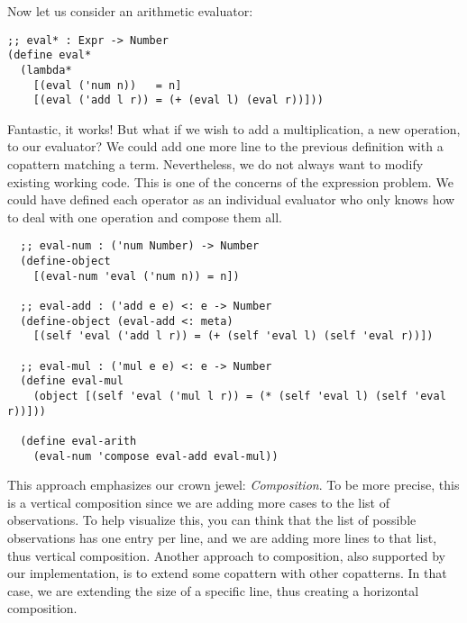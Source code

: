 Now let us consider an arithmetic evaluator:

\begin{verbatim}
;; eval* : Expr -> Number
(define eval*
  (lambda*
    [(eval ('num n))   = n]
    [(eval ('add l r)) = (+ (eval l) (eval r))]))
\end{verbatim}

Fantastic, it works! But what if we wish to add a multiplication, a new operation, to our evaluator? 
We could add one more line to the previous definition with a copattern matching a  term.
Nevertheless, we do not always want to modify existing working code.
This is one of the concerns of the expression problem.
We could have defined each operator as an individual evaluator who only knows how to deal with one operation and compose them all.

\begin{verbatim}
  ;; eval-num : ('num Number) -> Number
  (define-object
    [(eval-num 'eval ('num n)) = n])
  
  ;; eval-add : ('add e e) <: e -> Number
  (define-object (eval-add <: meta)
    [(self 'eval ('add l r)) = (+ (self 'eval l) (self 'eval r))])
  
  ;; eval-mul : ('mul e e) <: e -> Number
  (define eval-mul
    (object [(self 'eval ('mul l r)) = (* (self 'eval l) (self 'eval r))]))
  
  (define eval-arith
    (eval-num 'compose eval-add eval-mul))

\end{verbatim}


This approach emphasizes our crown jewel: \emph{Composition}.
To be more precise, this is a vertical composition since we are adding more cases to the list of observations.
To help visualize this, you can think that the list of possible observations has one entry per line, and we are adding more lines to that list, thus vertical composition.
Another approach to composition, also supported by our implementation, is to extend some copattern with other copatterns.
In that case, we are extending the size of a specific line, thus creating a horizontal composition.

